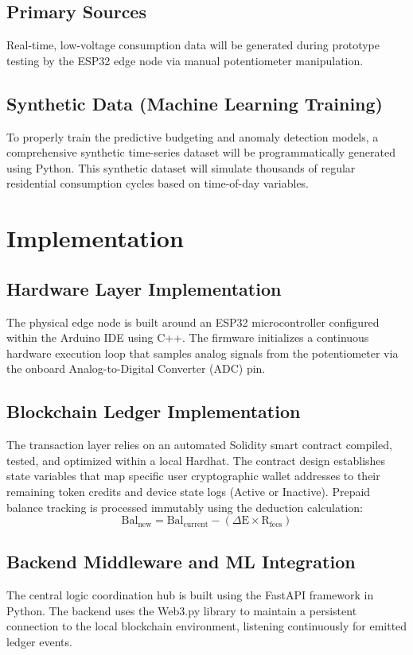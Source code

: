 \subsection{Primary Sources}
Real-time, low-voltage consumption data will be generated during prototype testing by the ESP32 edge node via manual potentiometer manipulation.
\subsection{Synthetic Data (Machine Learning Training)}
To properly train the predictive budgeting and anomaly detection models, a comprehensive synthetic time-series dataset will be programmatically generated using Python. This synthetic dataset will simulate thousands of regular residential consumption cycles based on time-of-day variables.

\section{Implementation}
\subsection{Hardware Layer Implementation}
The physical edge node is built around an ESP32 microcontroller configured within the Arduino IDE using C++. The firmware initializes a continuous hardware execution loop that samples analog signals from the potentiometer via the onboard Analog-to-Digital Converter (ADC) pin.
\subsection{Blockchain Ledger Implementation}
The transaction layer relies on an automated Solidity smart contract compiled, tested, and optimized within a local Hardhat. The contract design establishes state variables that map specific user cryptographic wallet addresses to their remaining token credits and device state logs (Active or Inactive). Prepaid balance tracking is processed immutably using the deduction calculation:  \cite{ref6}$$\text{Bal}_{\text{new}} = \text{Bal}_{\text{current}} - (\Delta\text{E} \times \text{R}_{\text{fees}})$$
\subsection{Backend Middleware and ML Integration}
The central logic coordination hub is built using the FastAPI framework in Python. The backend uses the Web3.py library to maintain a persistent connection to the local blockchain environment, listening continuously for emitted ledger events.\cite{ref7}

